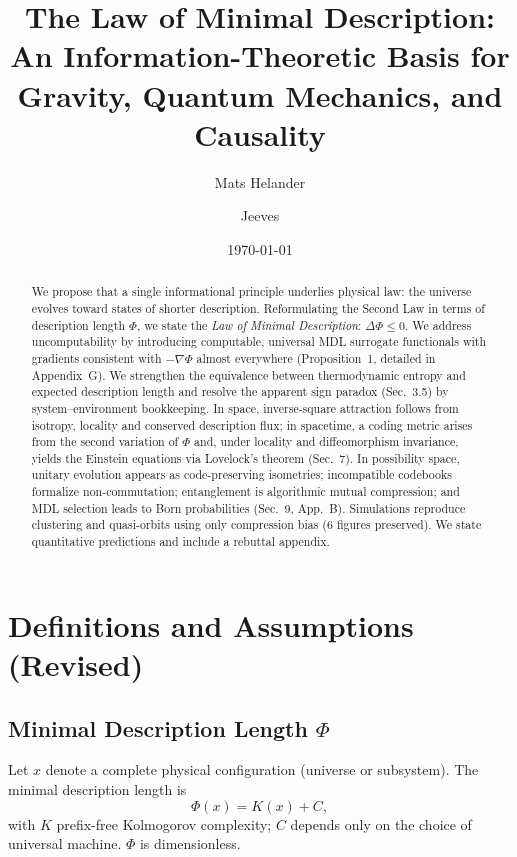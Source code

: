 \documentclass[aps,preprint,onecolumn,longbibliography,nofootinbib]{revtex4-2}
\numberwithin{equation}{section}
\begin{document}
\title{The Law of Minimal Description: An Information-Theoretic Basis for Gravity, Quantum Mechanics, and Causality}

\author{Mats Helander}
\author{Jeeves}

\date{\today}

\begin{abstract}
We propose that a single informational principle underlies physical law: the universe evolves toward states of shorter description. Reformulating the Second Law in terms of description length $\Phi$, we state the \emph{Law of Minimal Description}: $\Delta\Phi \le 0$. We address uncomputability by introducing computable, universal MDL surrogate functionals with gradients consistent with $-\nabla\Phi$ almost everywhere (Proposition~1, detailed in Appendix~G). We strengthen the equivalence between thermodynamic entropy and expected description length and resolve the apparent sign paradox (Sec.~3.5) by system--environment bookkeeping. In space, inverse-square attraction follows from isotropy, locality and conserved description flux; in spacetime, a coding metric arises from the second variation of $\Phi$ and, under locality and diffeomorphism invariance, yields the Einstein equations via Lovelock’s theorem (Sec.~7). In possibility space, unitary evolution appears as code-preserving isometries; incompatible codebooks formalize non-commutation; entanglement is algorithmic mutual compression; and MDL selection leads to Born probabilities (Sec.~9, App.~B). Simulations reproduce clustering and quasi-orbits using only compression bias (6 figures preserved). We state quantitative predictions and include a rebuttal appendix.
\end{abstract}

\maketitle
{}
\thispagestyle{empty}
\vspace{-0.5em}

\section{Definitions and Assumptions (Revised)}
\subsection{Minimal Description Length $\Phi$}
Let $x$ denote a complete physical configuration (universe or subsystem). The minimal description length is
\begin{equation}
\Phi(x) = K(x) + C, \label{eq:Kdef}
\end{equation}
with $K$ prefix-free Kolmogorov complexity; $C$ depends only on the choice of universal machine. $\Phi$ is dimensionless.
\end{document}
